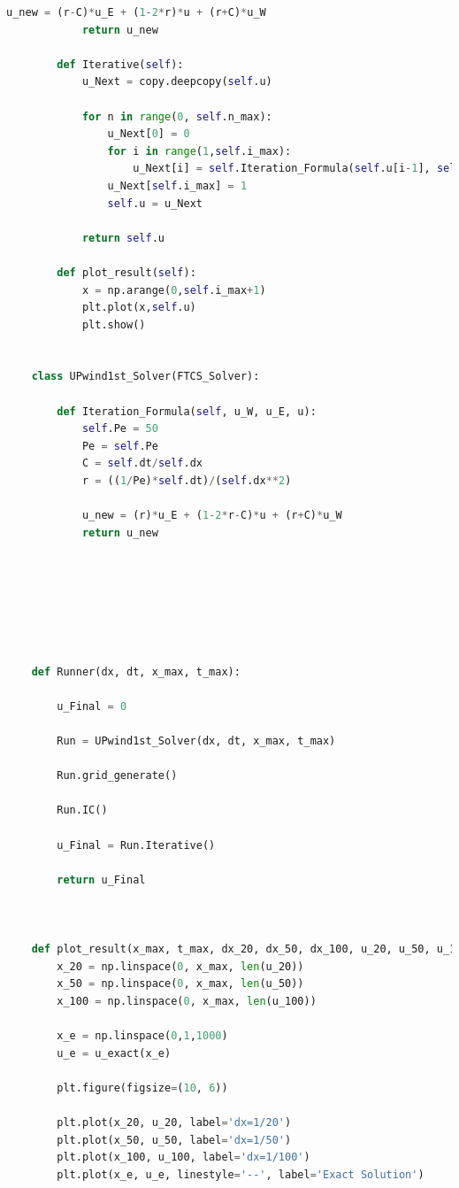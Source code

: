 \documentclass[12pt]{article}
\begin{document}
\begin{scriptsize}
\begin{lstlisting}[language=python,caption={Problem2, 1st UPwind Solver updated}]
            u_new = (r-C)*u_E + (1-2*r)*u + (r+C)*u_W
            return u_new
    
        def Iterative(self):
            u_Next = copy.deepcopy(self.u)
    
            for n in range(0, self.n_max):
                u_Next[0] = 0
                for i in range(1,self.i_max):
                    u_Next[i] = self.Iteration_Formula(self.u[i-1], self.u[i+1], self.u[i])
                u_Next[self.i_max] = 1
                self.u = u_Next
    
            return self.u
        
        def plot_result(self):
            x = np.arange(0,self.i_max+1)
            plt.plot(x,self.u)
            plt.show()
    
    
    class UPwind1st_Solver(FTCS_Solver):
    
        def Iteration_Formula(self, u_W, u_E, u):
            self.Pe = 50
            Pe = self.Pe
            C = self.dt/self.dx
            r = ((1/Pe)*self.dt)/(self.dx**2)
    
            u_new = (r)*u_E + (1-2*r-C)*u + (r+C)*u_W
            return u_new
    
    
    
    
        
    
    
    def Runner(dx, dt, x_max, t_max):
    
        u_Final = 0
    
        Run = UPwind1st_Solver(dx, dt, x_max, t_max)
    
        Run.grid_generate()
    
        Run.IC()
    
        u_Final = Run.Iterative()
    
        return u_Final
    
    
    
    def plot_result(x_max, t_max, dx_20, dx_50, dx_100, u_20, u_50, u_100):
        x_20 = np.linspace(0, x_max, len(u_20))
        x_50 = np.linspace(0, x_max, len(u_50))
        x_100 = np.linspace(0, x_max, len(u_100))
    
        x_e = np.linspace(0,1,1000)
        u_e = u_exact(x_e)
    
        plt.figure(figsize=(10, 6))
    
        plt.plot(x_20, u_20, label='dx=1/20')
        plt.plot(x_50, u_50, label='dx=1/50')
        plt.plot(x_100, u_100, label='dx=1/100')
        plt.plot(x_e, u_e, linestyle='--', label='Exact Solution')
    

\end{lstlisting}
\end{scriptsize}
\end{document}
